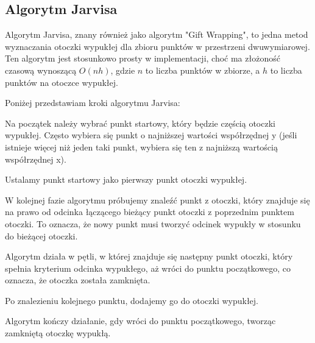 \subsection{Algorytm Jarvisa}
\quad Algorytm Jarvisa, znany również jako algorytm "Gift Wrapping", to jedna metod wyznaczania otoczki wypukłej dla zbioru punktów w przestrzeni dwuwymiarowej. Ten algorytm jest stosunkowo prosty w implementacji, choć ma złożoność czasową wynoszącą $O(nh)$, gdzie $n$ to liczba punktów w zbiorze, a $h$ to liczba punktów na otoczce wypukłej.

Poniżej przedstawiam kroki algorytmu Jarvisa:

Na początek należy wybrać punkt startowy, który będzie częścią otoczki wypukłej. Często wybiera się punkt o najniższej wartości współrzędnej y (jeśli istnieje więcej niż jeden taki punkt, wybiera się ten z najniższą wartością współrzędnej x).

Ustalamy punkt startowy jako pierwszy punkt otoczki wypukłej.

W kolejnej fazie algorytmu próbujemy znaleźć punkt z otoczki, który znajduje się na prawo od odcinka łączącego bieżący punkt otoczki z poprzednim punktem otoczki. To oznacza, że nowy punkt musi tworzyć odcinek wypukły w stosunku do bieżącej otoczki.

Algorytm działa w pętli, w której znajduje się następny punkt otoczki, który spełnia kryterium odcinka wypukłego, aż wróci do punktu początkowego, co oznacza, że otoczka została zamknięta.

Po znalezieniu kolejnego punktu, dodajemy go do otoczki wypukłej.

Algorytm kończy działanie, gdy wróci do punktu początkowego, tworząc zamkniętą otoczkę wypukłą.